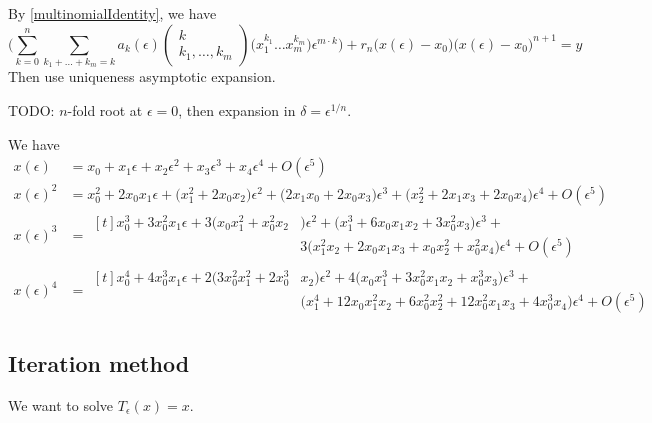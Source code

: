 By \ref{multinomialIdentity}, we have
\[ \bigg(\sum_{k=0}^n\sum_{k_1+\ldots +k_m = k}a_k(\epsilon)\begin{pmatrix}
k \\ k_1, \ldots, k_m
\end{pmatrix}\big(x_1^{k_1}\ldots x_m^{k_m}\big)\epsilon^{m\cdot k}\bigg) + r_n\big(x(\epsilon) - x_0\big)\big(x(\epsilon) - x_0\big)^{n+1} = y \]
Then use uniqueness asymptotic expansion.

TODO: $n$-fold root at $\epsilon = 0$, then expansion in $\delta = \epsilon^{1/n}$.

\begin{lemma}
We have
\begin{align*}
x(\epsilon)\, &= x_0 + x_1\epsilon + x_2\epsilon^2 + x_3\epsilon^3 + x_4\epsilon^4 + O(\epsilon^5) \\
x(\epsilon)^2 &= x_0^2 + 2x_0x_1\epsilon + \big(x_1^2 + 2x_0x_2\big)\epsilon^2 + \big(2x_1x_0 + 2x_0x_3\big)\epsilon^3 + \big(x_2^2 + 2x_1x_3 + 2x_0x_4\big)\epsilon^4 + O(\epsilon^5) \\
x(\epsilon)^3 &= \begin{aligned}[t]x_0^3 + 3x_0^2x_1\epsilon + 3\big(x_0x_1^2 + x_0^2x_2&\big)\epsilon^2 + \big(x_1^3 + 6x_0x_1x_2 + 3x_0^2x_3\big)\epsilon^3 + \\
&3\big(x_1^2x_2 + 2x_0x_1x_3 + x_0x_2^2 + x_0^2x_4\big)\epsilon^4 + O(\epsilon^5)\end{aligned} \\
x(\epsilon)^4 &= \begin{aligned}[t] x_0^4 + 4x_0^3x_1\epsilon + 2\big(3x_0^2x_1^2 + 2x_0^3&x_2\big)\epsilon^2 + 4\big(x_0x_1^3 + 3x_0^2x_1x_2 + x_0^3x_3\big)\epsilon^3 + \\
&\big(x_1^4 + 12x_0x_1^2x_2 + 6x_0^2x_2^2 + 12x_0^2x_1x_3 + 4x_0^3x_4\big)\epsilon^4 + O(\epsilon^5)\end{aligned}
\end{align*}
\end{lemma}


\subsection{Iteration method}
We want to solve $T_\epsilon(x) = x$.

